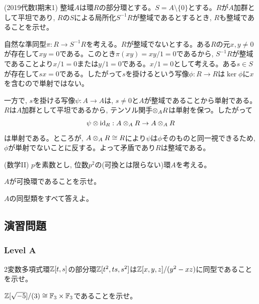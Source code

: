 \begin{egprob} (2019代数I期末1)
整域$A$は環$R$の部分環とする。$S=A\setminus{\{ 0 \}}$とする。$R$が$A$加群として平坦であり,  $R$の$S$による局所化$S^{-1}R$が整域であるとするとき, $R$も整域であることを示せ。
\end{egprob}
\begin{egans}
自然な準同型$\pi: R\to S^{-1}R$を考える。$R$が整域でないとする。ある$R$の元$x,y\neq 0$が存在して$xy=0$である。このとき$\pi(xy) = xy/1 = 0$であるから, $S^{-1}R$が整域であることより$x/1 = 0$または$y/1 = 0$である。$x/1=0$として考える。ある$s\in S$が存在して$sx = 0$である。したがって$s$を掛けるという写像$\phi:R\to R$は$\ker{\phi}$に$x$を含むので単射ではない。

一方で, $s$を掛ける写像$\psi:A\to A$は, $s\neq 0$と$A$が整域であることから単射である。$R$は$A$加群として平坦であるから, テンソル関手$\mathbin{\otimes}_{A} R$は単射を保つ。したがって
\[\psi \mathbin{\otimes} \mathrm{id}_{R}:  A\mathbin{\otimes}_{A} R \to A\mathbin{\otimes}_{A} R\]
は単射である。ところが, $A\mathbin{\otimes}_{A} R \cong R$により$\psi$は$\phi$そのものと同一視できるため, $\phi$が単射でないことに反する。よって矛盾であり$R$は整域である。
\end{egans}


\newpage
\begin{egprob} (数学II)
$p$を素数とし, 位数$p^2$の(可換とは限らない)環$A$を考える。
\ben
\item $A$が可換環であることを示せ。
\item $A$の同型類をすべて答えよ。
\een
\end{egprob}






\clearpage
\subsection{演習問題}
\subsubsection{Level A}


\begin{prob}
2変数多項式環$\mathbb{Z}[t,s]$の部分環$\mathbb{Z}[t^2,ts,s^2]$は$\mathbb{Z}[x,y,z]/(y^2-xz)$に同型であることを示せ。
\end{prob}

\begin{prob}
$\mathbb{Z}[\sqrt{-5}]/(3) \cong \mathbb{F}_{3}\times \mathbb{F}_{3}$であることを示せ。
\end{prob}

